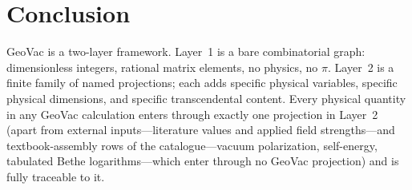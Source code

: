 \documentclass[11pt]{article}
\begin{document}
\section{Conclusion}
\label{sec:conclusion}

GeoVac is a two-layer framework.  Layer~1 is a bare combinatorial
graph: dimensionless integers, rational matrix elements, no
physics, no $\pi$.  Layer~2 is a finite family of named projections;
each adds specific physical variables, specific physical
dimensions, and specific transcendental content.  Every physical
quantity in any GeoVac calculation enters through exactly one
projection in Layer~2 (apart from external inputs---literature values and applied field
strengths---and textbook-assembly rows of the catalogue---vacuum
polarization, self-energy, tabulated Bethe logarithms---which enter
through no GeoVac projection) and is fully traceable to it.
\end{document}
